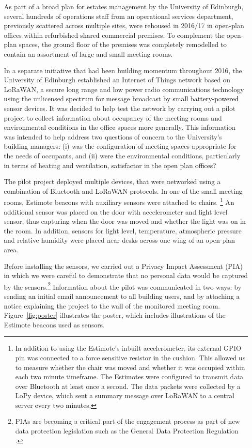 As part of a broad plan for estates management by the University of
Edinburgh, several hundreds of operations staff from an operational
services department, previously scattered across multiple sites, were
rehoused in 2016/17 in open-plan offices within refurbished shared
commercial premises. To complement the open-plan spaces, the ground
floor of the premises was completely remodelled to contain an
assortment of large and small meeting rooms. 

In a separate initiative that had been building momentum throughout
2016, the University of Edinburgh established an Internet of Things
network based on LoRaWAN, a secure long range and low power radio
communications technology using the unlicensed spectrum for message
broadcast by small battery-powered sensor devices. It was decided to
help test the network by carrying out a pilot project to collect
information about occupancy of the meeting rooms and environmental
conditions in the office spaces more generally. This information was
intended to help address two questions of concern to the University’s
building managers: (i) was the configuration of meeting spaces
appropriate for the needs of occupants, and (ii) were the
environmental conditions, particularly in terms of heating and
ventilation, satisfactor in the open plan offices? 

The pilot project deployed multiple devices, that were networked using
a combination of Bluetooth and LoRaWAN protocols. In one of the small
meeting rooms, Estimote beacons with auxiliary sensors were attached
to chairs.%
\footnote{
 In addition to using the Estimote's inbuilt accelerometer, its
 external GPIO pin was connected to a force sensitive resistor in the
 cushion. This allowed us to measure whether the chair was moved and
 whether it was occupied within each two minute timeframe. The
 Estimotes were configured to transmit data over Bluetooth at least once a
 second. The data packets were collected by
 a LoPy device,  which sent a summary message over LoRaWAN to a
 central server every two minutes. } 
An additional sensor was placed
on the door with accelerometer and light level sensor, thus capturing
when the door was moved and whether the light was on in the room. In
addition, sensors for light level, temperature, atmospheric pressure
and relative humidity were placed near desks across one wing of an
open-plan area.

Before installing the sensors, we carried out a Privacy Impact
Assessment (PIA) in which we were careful to demonstrate that no
personal data would be captured by the sensors.\footnote{PIAs are
  becoming a critical part of the engagement process as part of new
  data protection legislation such as the General Data Protection
  Regulation \cite{GDPR}.} Information about the pilot was
communicated in two ways: by sending an initial email announcement to
all building users, and by attaching a notice explaining the project
to the wall of the monitored meeting room. Figure~\ref{fig:poster}
illustrates the poster, which includes illustrations of the Estimote
beacons used as sensors.
 
